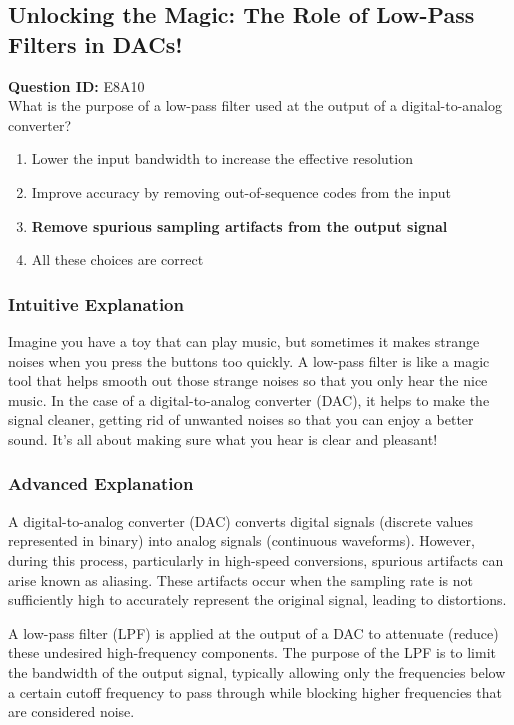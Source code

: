 \subsection{Unlocking the Magic: The Role of Low-Pass Filters in DACs!}

\begin{tcolorbox}
\textbf{Question ID:} E8A10\\
What is the purpose of a low-pass filter used at the output of a digital-to-analog converter?\\
\begin{enumerate}[label=\Alph*.]
    \item Lower the input bandwidth to increase the effective resolution
    \item Improve accuracy by removing out-of-sequence codes from the input
    \item \textbf{Remove spurious sampling artifacts from the output signal}
    \item All these choices are correct
\end{enumerate}
\end{tcolorbox}

\subsubsection{Intuitive Explanation}
Imagine you have a toy that can play music, but sometimes it makes strange noises when you press the buttons too quickly. A low-pass filter is like a magic tool that helps smooth out those strange noises so that you only hear the nice music. In the case of a digital-to-analog converter (DAC), it helps to make the signal cleaner, getting rid of unwanted noises so that you can enjoy a better sound. It’s all about making sure what you hear is clear and pleasant!

\subsubsection{Advanced Explanation}
A digital-to-analog converter (DAC) converts digital signals (discrete values represented in binary) into analog signals (continuous waveforms). However, during this process, particularly in high-speed conversions, spurious artifacts can arise known as aliasing. These artifacts occur when the sampling rate is not sufficiently high to accurately represent the original signal, leading to distortions. 

A low-pass filter (LPF) is applied at the output of a DAC to attenuate (reduce) these undesired high-frequency components. The purpose of the LPF is to limit the bandwidth of the output signal, typically allowing only the frequencies below a certain cutoff frequency to pass through while blocking higher frequencies that are considered noise. 

